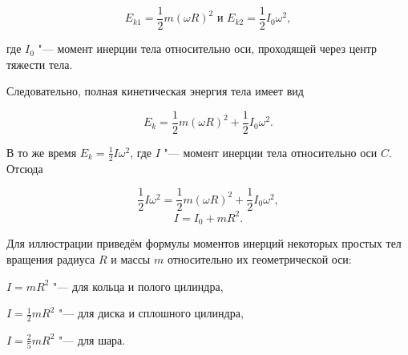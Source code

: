 \begin{equation}
    E_{k1} = \frac{1}{2} m (\omega R)^2 
    \text{ и }
    E_{k2} = \frac{1}{2}I_0 \omega^2,
\end{equation}

где $I_0$ "---  момент инерции тела относительно оси, проходящей через центр тяжести тела.

Следовательно, полная кинетическая энергия тела имеет вид

\begin{equation}
    E_k = \frac{1}{2}m(\omega R)^2 + \frac{1}{2}I_0\omega^2.
\end{equation}

В то же время $E_k = \frac{1}{2}I\omega^2$, где $I$ "--- момент инерции тела относительно оси $C$.
Отсюда

\begin{equation*}
    \frac{1}{2}I\omega^2 = \frac{1}{2}m(\omega R)^2 + \frac{1}{2}I_0\omega^2,
\end{equation*}
\begin{equation}
    I = I_0 + mR^2.
\end{equation}

Для иллюстрации приведём формулы моментов инерций некоторых простых тел вращения радиуса $R$ и массы $m$ относительно их геометрической оси:

$I = mR^2$ "--- для кольца и полого цилиндра,
    
$I = \frac{1}{2}mR^2$ "--- для диска и сплошного цилиндра,

$I = \frac{2}{5}mR^2$ "--- для шара. 